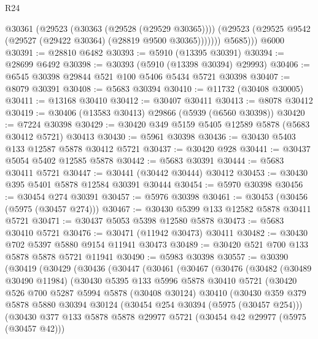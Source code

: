 \begin{lexlean}{R24}
\begin{coremodule}
            @30361
              (@29523 (@30363 (@29528 (@29529 @30365))))
              (@29523 (@29525 @9542 (@29527 (@29422 @30364) (@28819 @9500 @30365)))))))
          @5685)))
    @6000
@30391 := @28810 @6482
@30393 := @5910 (@13395 @30391)
@30394 := @28699 @6492
@30398 := @30393 (@5910 (@13398 @30394) @29993)
@30406 := @6545 @30398 @29844 @521 @100 @5406 @5434 @5721 @30398
@30407 := @8079 @30391
@30408 := @5683 @30394
@30410 := @11732 (@30408 @30005)
@30411 := @13168 @30410
@30412 := @30407 @30411
@30413 := @8078 @30412
@30419 := @30406 (@13583 @30413) @29866 (@5939 (@6560 @30398))
@30420 := @7224 @30398
@30429 := @30420 @349 @5159 @5405 @12589 @5878 (@5683 @30412 @5721) @30413
@30430 := @5961 @30398
@30436 := @30430 @5403 @133 @12587 @5878 @30412 @5721
@30437 := @30420 @928
@30441 := @30437 @5054 @5402 @12585 @5878
@30442 := @5683 @30391
@30444 := @5683 @30411 @5721
@30447 := @30441 (@30442 @30444) @30412
@30453 := @30430 @395 @5401 @5878 @12584 @30391 @30444
@30454 := @5970 @30398
@30456 := @30454 @274 @30391
@30457 := @5976 @30398
@30461 := @30453 (@30456 (@5975 (@30457 @274)))
@30467 := @30430 @5399 @133 @12582 @5878 @30411 @5721
@30471 := @30437 @5053 @5398 @12580 @5878
@30473 := @5683 @30410 @5721
@30476 := @30471 (@11942 @30473) @30411
@30482 := @30430 @702 @5397 @5880 @9154 @11941 @30473
@30489 := @30420 @521 @700 @133 @5878 @5878 @5721 @11941
@30490 := @5983 @30398
@30557 := @30390
    (@30419
      (@30429
        (@30436
          (@30447
            (@30461
              (@30467
                (@30476
                  (@30482
                    (@30489 @30490 @11984)
                    (@30430
                      @5395
                      @133
                      @5996
                      @5878
                      @30410
                      @5721
                      (@30420
                        @526
                        @700
                        @5287
                        @5994
                        @5878
                        (@30408 @30124)
                        @30410
                        (@30430
                          @359
                          @379
                          @5878
                          @5880
                          @30394
                          @30124
                          (@30454 @254 @30394 (@5975 (@30457 @254)))
                          (@30430
                            @377
                            @133
                            @5878
                            @5878
                            @29977
                            @5721
                            (@30454 @42 @29977 (@5975 (@30457 @42)))

\end{coremodule}
\end{lexlean}
